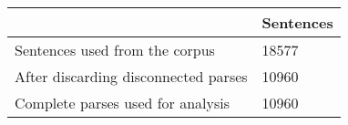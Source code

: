 	\begin{tabular}{|l|l|}
		\hline
	 & Sentences \\ 
		\hline
		Sentences used from the corpus & 18577\\ 
		\hline
		After discarding disconnected parses & 10960\\ 
		\hline
		Complete parses used for analysis & 10960\\ 
		\hline
	\end{tabular}
